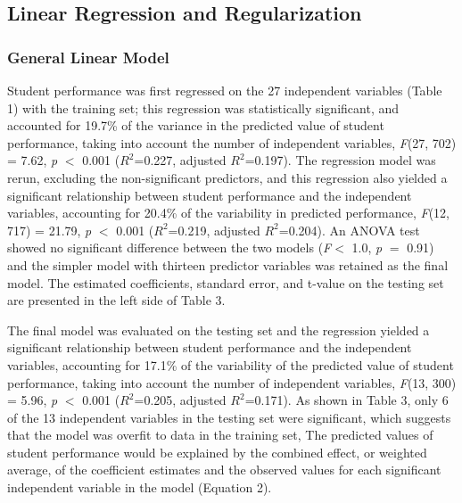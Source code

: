 \documentclass[sigconf]{acmart}
\begin{document}
\subsection{Linear Regression and Regularization}

\subsubsection{General Linear Model}

Student performance was first regressed on the 27 independent variables 
(Table 1) with the training set; this regression was statistically 
significant, and accounted for 19.7\% of the variance in the predicted
value of student performance, taking into account the number of 
independent variables, \textit{F}(27, 702) = 7.62, \textit{p} $<$ 0.001 
($R^2$=0.227, adjusted $R^2$=0.197). The regression model was rerun, 
excluding the non-significant predictors, and this regression also 
yielded a significant relationship between student performance and the 
independent variables, accounting for 20.4\% of the variability in 
predicted performance, \textit{F}(12, 717) = 21.79, \textit{p} $<$ 0.001 
($R^2$=0.219, adjusted $R^2$=0.204). An ANOVA test showed no significant 
difference between the two models (\textit{F}$<$ 1.0, \textit{p} $=$ 0.91) 
and the simpler model with thirteen predictor variables was retained as 
the final model. The estimated coefficients, standard error, and t-value 
on the testing set are presented in the left side of Table 3.



The final model was evaluated on the testing set and the regression yielded 
a significant relationship between student performance and the independent 
variables, accounting for 17.1\% of the variability of the predicted value 
of student performance, taking into account the number of independent 
variables, \textit{F}(13, 300) = 5.96, \textit{p} $<$ 0.001 ($R^2$=0.205, 
adjusted $R^2$=0.171). As shown in Table 3, only 6 of the 13 independent
variables in the testing set were significant, which suggests that the 
model was overfit to data in the training set, The predicted values of
student performance would be explained by the combined effect, or 
weighted average, of the coefficient estimates and the observed values 
for each significant independent variable in the model (Equation 2).
\end{document}
